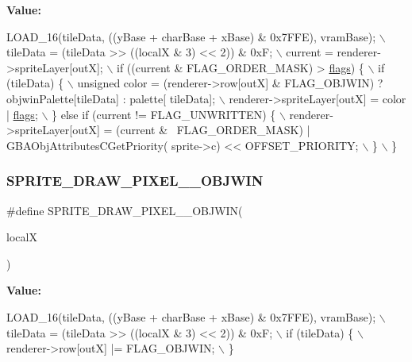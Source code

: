 {\bfseries Value\+:}
\begin{DoxyCode}
LOAD\_16(tileData, ((yBase + charBase + xBase) & 0x7FFE), vramBase); \(\backslash\)
    tileData = (tileData >> ((localX & 3) << 2)) & 0xF; \(\backslash\)
    current = renderer->spriteLayer[outX]; \(\backslash\)
    if ((current & FLAG\_ORDER\_MASK) > \mbox{\hyperlink{lr35902_2decoder_8c_a11f29eea941556f0630cfd3285f565c0}{flags}}) \{ \(\backslash\)
        if (tileData) \{ \(\backslash\)
            unsigned color = (renderer->row[outX] & FLAG\_OBJWIN) ? objwinPalette[tileData] : palette[
      tileData]; \(\backslash\)
            renderer->spriteLayer[outX] = color | \mbox{\hyperlink{lr35902_2decoder_8c_a11f29eea941556f0630cfd3285f565c0}{flags}}; \(\backslash\)
        \} \textcolor{keywordflow}{else} \textcolor{keywordflow}{if} (current != FLAG\_UNWRITTEN) \{ \(\backslash\)
            renderer->spriteLayer[outX] = (current & ~FLAG\_ORDER\_MASK) | GBAObjAttributesCGetPriority(
      sprite->c) << OFFSET\_PRIORITY; \(\backslash\)
        \} \(\backslash\)
    \}
\end{DoxyCode}
\mbox{\label{software-obj_8c_a7209290253a5783ebacce01ce9519508}} 
\subsubsection{\texorpdfstring{S\+P\+R\+I\+T\+E\+\_\+\+D\+R\+A\+W\+\_\+\+P\+I\+X\+E\+L\+\_\+\_\+\+O\+B\+J\+W\+IN}{SPRITE\_DRAW\_PIXEL\_16\_OBJWIN}}
{\footnotesize\ttfamily \#define S\+P\+R\+I\+T\+E\+\_\+\+D\+R\+A\+W\+\_\+\+P\+I\+X\+E\+L\+\_\+\_\+\+O\+B\+J\+W\+IN(\begin{DoxyParamCaption}\item[{}]{localX }\end{DoxyParamCaption})}

{\bfseries Value\+:}
\begin{DoxyCode}
LOAD\_16(tileData, ((yBase + charBase + xBase) & 0x7FFE), vramBase); \(\backslash\)
    tileData = (tileData >> ((localX & 3) << 2)) & 0xF; \(\backslash\)
    if (tileData) \{ \(\backslash\)
        renderer->row[outX] |= FLAG\_OBJWIN; \(\backslash\)
    \}
\end{DoxyCode}
\mbox{\label{software-obj_8c_a8d32eb985c0e830c427cede1675b6be2}} 
